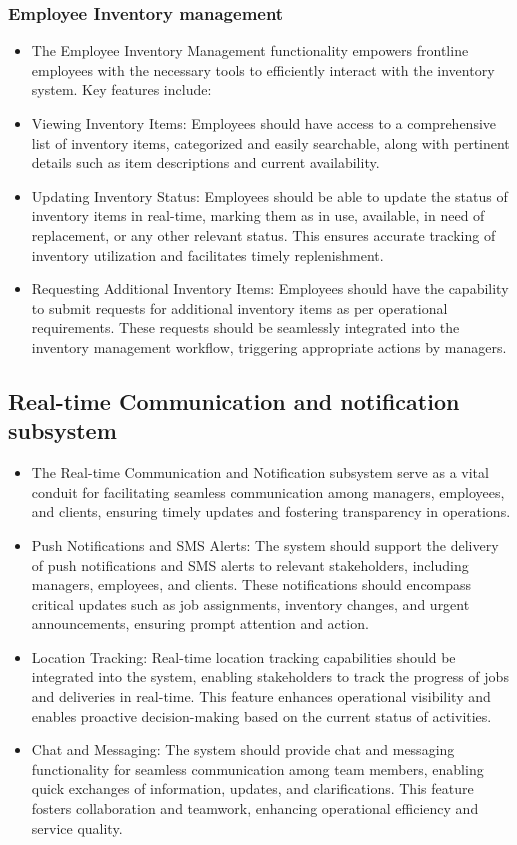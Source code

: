\documentclass{article}
\begin{document}
\subsubsection*{Employee Inventory management}	
\begin{itemize}
    \item The Employee Inventory Management functionality empowers frontline employees with the necessary tools to efficiently interact with the inventory system. Key features include:
    \item Viewing Inventory Items: Employees should have access to a comprehensive list of inventory items, categorized and easily searchable, along with pertinent details such as item descriptions and current availability.
    \item Updating Inventory Status: Employees should be able to update the status of inventory items in real-time, marking them as in use, available, in need of replacement, or any other relevant status. This ensures accurate tracking of inventory utilization and facilitates timely replenishment.
    \item Requesting Additional Inventory Items: Employees should have the capability to submit requests for additional inventory items as per operational requirements. These requests should be seamlessly integrated into the inventory management workflow, triggering appropriate actions by managers.
\end{itemize}
\subsection*{Real-time Communication and notification subsystem}	
\begin{itemize}
    \item The Real-time Communication and Notification subsystem serve as a vital conduit for facilitating seamless communication among managers, employees, and clients, ensuring timely updates and fostering transparency in operations.
    \item Push Notifications and SMS Alerts: The system should support the delivery of push notifications and SMS alerts to relevant stakeholders, including managers, employees, and clients. These notifications should encompass critical updates such as job assignments, inventory changes, and urgent announcements, ensuring prompt attention and action.
    \item Location Tracking: Real-time location tracking capabilities should be integrated into the system, enabling stakeholders to track the progress of jobs and deliveries in real-time. This feature enhances operational visibility and enables proactive decision-making based on the current status of activities.
    \item Chat and Messaging: The system should provide chat and messaging functionality for seamless communication among team members, enabling quick exchanges of information, updates, and clarifications. This feature fosters collaboration and teamwork, enhancing operational efficiency and service quality.
\end{itemize}
\end{document}
